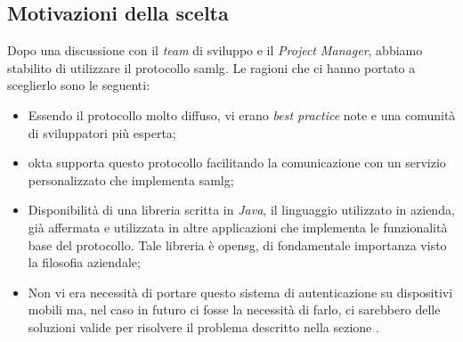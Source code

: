 \subsection{Motivazioni della scelta}
Dopo una discussione con il \textit{team} di sviluppo e il \textit{Project Manager}, abbiamo stabilito di utilizzare il protocollo \gls{samlg}. Le ragioni che ci hanno portato a sceglierlo sono le seguenti:
\begin{itemize}
    \item Essendo il protocollo molto diffuso, vi erano \textit{best practice} note e una comunità di sviluppatori più esperta;
    \item \gls{okta} supporta questo protocollo facilitando la comunicazione con un servizio personalizzato che implementa \gls{samlg};
    \item Disponibilità di una libreria scritta in \textit{Java}, il linguaggio utilizzato in azienda, già affermata e utilizzata in altre applicazioni che implementa le funzionalità base del protocollo. Tale libreria è \gls{opensg}, di fondamentale importanza visto la filosofia aziendale;
    \item Non vi era necessità di portare questo sistema di autenticazione su dispositivi mobili ma, nel caso in futuro ci fosse la necessità di farlo, ci sarebbero delle soluzioni valide per risolvere il problema descritto nella sezione .
\end{itemize}

